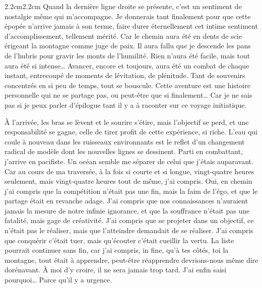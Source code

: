 \begin{adjustwidth}{2.2cm}{2.2cm}
Quand la dernière ligne droite se présente, c’est un sentiment de nostalgie même qui m’accompagne. Je donnerais tant finalement pour que cette épopée n’arrive jamais à son terme, faire durer éternellement cet intime sentiment d’accomplissement, tellement mérité. Car le chemin aura été en dents de scie érigeant la montagne comme juge de paix. Il aura fallu que je descende les pans de l’hubris pour gravir les monts de l’humilité. Rien n’aura été facile, mais tout aura été si intense… Avancer, encore et toujours, aura été un combat de chaque instant, entrecoupé de moments de lévitation, de plénitude. Tant de souvenirs concentrés en si peu de temps, tout se bouscule. Cette aventure est une histoire personnelle qui ne se partage pas, ou peut-être que si finalement… Car je ne sais pas si je peux parler d’épilogue tant il y a à raconter sur ce voyage initiatique.

À l’arrivée, les bras se lèvent et le sourire s’étire, mais l’objectif se perd, et une responsabilité se gagne, celle de tirer profit de cette expérience, si riche. L’eau qui coule à nouveau dans les ruisseaux environnants est le reflet d’un changement radical de modèle dont les nouvelles lignes se dessinent. Parti en combattant, j’arrive en pacifiste. Un océan semble me séparer de celui que j’étais auparavant. Car au cours de ma traversée, à la fois si courte et si longue, vingt-quatre heures seulement, mais vingt-quatre heures tout de même, j’ai compris. Oui, en chemin j’ai compris que la compétition n’était pas une fin, mais la faim de l’égo, et que le partage était en revanche adage. J’ai compris que nos connaissances n’auraient jamais la mesure de notre infinie ignorance, et que la souffrance n’était pas une fatalité, mais gage de créativité. J’ai compris que se projeter dans un objectif, ce n’était pas le réaliser, mais que l’atteindre demandait de se réaliser. J’ai compris que conquérir c’était tuer, mais qu’écouter c’était cueillir la vertu. La liste pourrait continuer sans fin, car j’ai compris, in fine, qu’à tes côtés, toi la montagne, tout était à apprendre, peut-être réapprendre devrions-nous même dire dorénavant. À moi d’y croire, il ne sera jamais trop tard. J’ai enfin saisi pourquoi… Parce qu’il y a urgence.


\end{adjustwidth}
